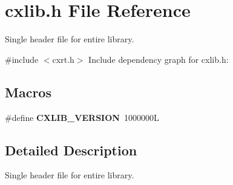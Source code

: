 \hypertarget{a00014}{}\section{cxlib.\+h File Reference}
\label{a00014}


Single header file for entire library.  


{\ttfamily \#include $<$cxrt.\+h$>$}\newline
Include dependency graph for cxlib.\+h\+:
\subsection*{Macros}
\begin{DoxyCompactItemize}
\item 
\mbox{\label{a00014_a85ec71647670ef7260303289e48029fb}} 
\#define {\bfseries C\+X\+L\+I\+B\+\_\+\+V\+E\+R\+S\+I\+ON}~1000000L
\end{DoxyCompactItemize}


\subsection{Detailed Description}
Single header file for entire library. 

